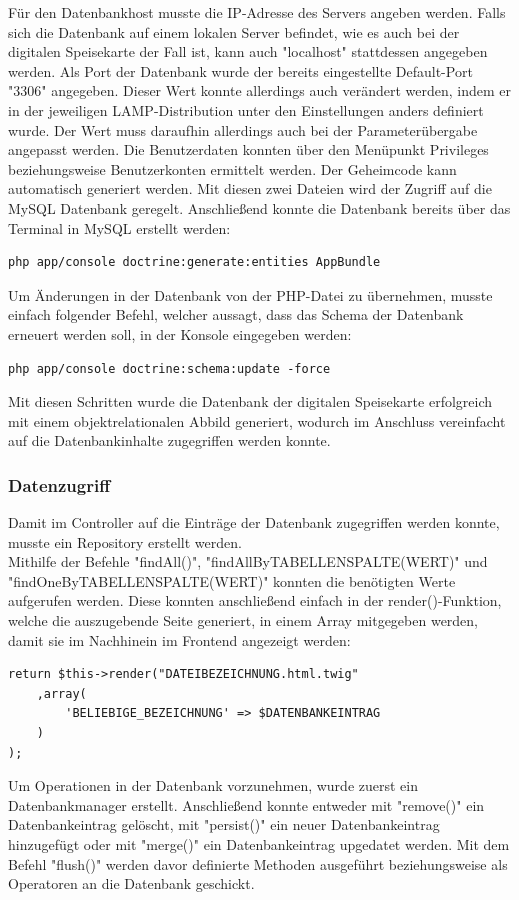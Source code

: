 Für den Datenbankhost musste die IP-Adresse des Servers angeben werden. Falls sich die Datenbank auf einem lokalen Server befindet, wie es auch bei der digitalen Speisekarte der Fall ist, kann auch "localhost" stattdessen angegeben werden. Als Port der Datenbank wurde der bereits eingestellte Default-Port "3306" angegeben. Dieser Wert konnte allerdings auch verändert werden, indem er in der jeweiligen LAMP-Distribution unter den Einstellungen anders definiert wurde. Der Wert muss daraufhin allerdings auch bei der Parameterübergabe angepasst werden. Die Benutzerdaten konnten über den Menüpunkt Privileges beziehungsweise Benutzerkonten ermittelt werden. Der Geheimcode kann automatisch generiert werden.
Mit diesen zwei Dateien wird der Zugriff auf die MySQL Datenbank geregelt.
Anschließend konnte die Datenbank bereits über das Terminal in MySQL erstellt werden:
	\lstset{language = bash}
  	\begin{lstlisting}
php app/console doctrine:generate:entities AppBundle
  	\end{lstlisting}
Um Änderungen in der Datenbank von der PHP-Datei zu übernehmen, musste einfach folgender Befehl, welcher aussagt, dass das Schema der Datenbank erneuert werden soll, in der Konsole eingegeben werden:
	\lstset{language=php}
  	\begin{lstlisting}
php app/console doctrine:schema:update -force
  	\end{lstlisting}
Mit diesen Schritten wurde die Datenbank der digitalen Speisekarte erfolgreich mit einem objektrelationalen Abbild generiert, wodurch im Anschluss vereinfacht auf die Datenbankinhalte zugegriffen werden konnte.

    \subsubsection{Datenzugriff}

Damit im Controller auf die Einträge der Datenbank zugegriffen werden konnte, musste ein Repository erstellt werden.
\\
Mithilfe der Befehle "findAll()", "findAllByTABELLENSPALTE(WERT)" und "findOneByTABELLENSPALTE(WERT)" konnten die benötigten Werte aufgerufen werden.
Diese konnten anschließend einfach in der render()-Funktion, welche die auszugebende Seite generiert, in einem Array mitgegeben werden, damit sie im Nachhinein im Frontend angezeigt werden:
	\lstset{language=php}
  	\begin{lstlisting}
return $this->render("DATEIBEZEICHNUNG.html.twig"
    ,array(
    	'BELIEBIGE_BEZEICHNUNG' => $DATENBANKEINTRAG
    )
);
  	\end{lstlisting}
Um Operationen in der Datenbank vorzunehmen, wurde zuerst ein Datenbankmanager erstellt. Anschließend konnte entweder mit "remove()" ein Datenbankeintrag gelöscht, mit "persist()" ein neuer Datenbankeintrag hinzugefügt oder mit "merge()" ein Datenbankeintrag upgedatet werden. Mit dem Befehl "flush()" werden davor definierte Methoden ausgeführt beziehungsweise als Operatoren an die Datenbank geschickt.
	

